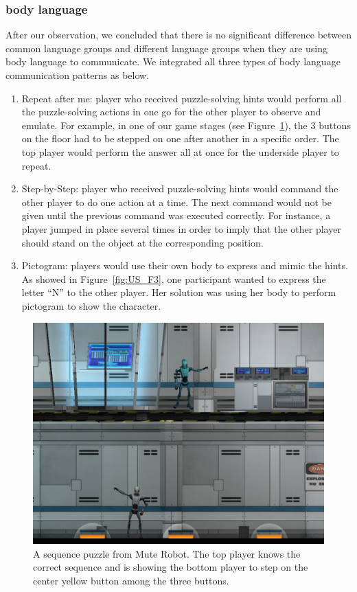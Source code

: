 \subsubsection{body language}
After our observation, we concluded that there is no significant difference between common language groups and different language groups when they are using body language to communicate. We integrated all three types of body language communication patterns as below.

\begin{enumerate}
  \item Repeat after me: player who received puzzle-solving hints would perform all the puzzle-solving actions in one go for the other player to observe and emulate. For example, in one of our game stages (see Figure~\ref{fig:US_F2}), the 3 buttons on the floor had to be stepped on one after another in a specific order. The top player would perform the answer all at once for the underside player to repeat. 
 
  \item Step-by-Step: player who received puzzle-solving hints would command the other player to do one action at a time. The next command would not be given until the previous command was executed correctly. For instance, a player jumped in place several times in order to imply that the other player should stand on the object at the corresponding position.
                                  
  \item Pictogram: players would use their own body to express and mimic the hints. As showed in Figure~\ref{fig:US_F3}, one participant wanted to express the letter ``N'' to the other player. Her solution was using her body to perform pictogram to show the character.
\end{enumerate}

\begin{figure}[!h]
\centering
\includegraphics[width=0.7\columnwidth]{Figures/US_F2.jpg}
\caption{A sequence puzzle from Mute Robot. The top player knows the correct sequence and is showing the bottom player to step on the center yellow button among the three buttons.}
\label{fig:US_F2}
\end{figure}

